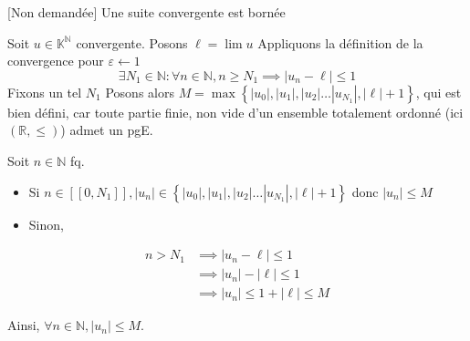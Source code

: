 \documentclass{article}
\renewenvironment{question_kholle}[2][ ]
{
	\subsection{\texorpdfstring{#2}{}}
	\notblank{#1}
	{
		\noindent #1
		\bigbreak
	}
	{}
	\begin{proof}
}
{
	\end{proof}
}
\begin{document}
\begin{question_kholle}{[Non
				demandée] Une suite convergente est bornée}

	Soit $u \in
		\mathbb{K}^{\mathbb{N}}$ convergente.
	Posons $\ell = \lim u$
	Appliquons la définition de la
	convergence pour $\varepsilon \leftarrow 1$
	$$
		\exists N_{1}\in \mathbb{N}:
		\forall n \in \mathbb{N}, n
		\geqslant N_{1} \implies
		|u_{n}-\ell| \leqslant 1
	$$
	Fixons un tel $N_{1}$
	Posons alors $M = \max\left\{
		|u_{0}|, |u_{1}|, |u_{2}| \dots
		|u_{N_{1}}|, |\ell|+1 \right\}$,
	qui est bien défini, car toute
	partie finie, non vide d'un
	ensemble totalement ordonné (ici
	$(\mathbb{R}, \leqslant)$) admet un pgE.

	Soit $n \in \mathbb{N}$ fq.
	\begin{itemize}
		\item Si $n \in [[0, N_{1}]],
			      |u_{n}| \in \left\{ |u_{0}|,
			      |u_{1}|, |u_{2}| \dots
			      |u_{N_{1}}|, |\ell|+1
			      \right\}$ donc $|u_{n}| \leqslant M$
		\item Sinon,
	\end{itemize}

	\begin{align*}
		n> N_{1} & \implies |u_{n} -
		\ell| \leqslant 1                        \\
		         & \implies |u_{n}| - |\ell|
		\leqslant 1                              \\
		         & \implies |u_{n}| \leqslant 1+
		|\ell| \leqslant M
	\end{align*}

	Ainsi, $\forall n \in \mathbb{N},
		|u_{n}| \leqslant M$.
\end{question_kholle}
\end{document}
